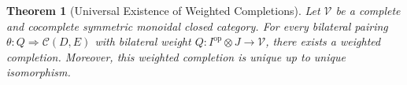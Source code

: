 \documentclass[11pt]{article}
\theoremstyle{plain}
\newtheorem{theorem}{Theorem}[section]
\theoremstyle{definition}
\theoremstyle{remark}
\newcommand{\V}{\mathcal{V}}
\newcommand{\C}{\mathcal{C}}
\newcommand{\op}{\mathrm{op}}
\begin{document}
\begin{center}
\end{center}

\begin{theorem}[Universal Existence of Weighted Completions]\label{thm:universal-existence}
Let $\V$ be a complete and cocomplete symmetric monoidal closed category. For every bilateral pairing $\theta : Q \Rightarrow \C(D,E)$ with bilateral weight $Q : I^{\op} \otimes J \to \V$, there exists a weighted completion. Moreover, this weighted completion is unique up to unique isomorphism.
\end{theorem}
\end{document}
